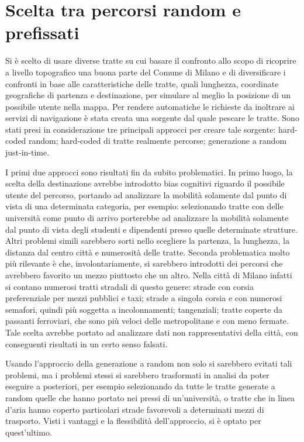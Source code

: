 \section{Scelta tra percorsi random e prefissati}

Si è scelto di usare diverse tratte su cui basare il confronto allo scopo di ricoprire a livello topografico una buona parte del Comune di Milano e di diversificare i confronti in base alle caratteristiche delle tratte, quali lunghezza, coordinate geografiche di partenza e destinazione, per simulare al meglio la posizione di un possibile utente nella mappa. Per rendere automatiche le richieste da inoltrare ai servizi di navigazione è stata creata una sorgente dal quale pescare le tratte. Sono stati presi in considerazione tre principali approcci per creare tale sorgente: hard-coded random; hard-coded di tratte realmente percorse; generazione a random just-in-time.

I primi due approcci sono risultati fin da subito problematici. In primo luogo, la scelta della destinazione avrebbe introdotto bias cognitivi riguardo il possibile utente del percorso, portando ad analizzare la mobilità solamente dal punto di vista di una determinata categoria, per esempio: selezionando tratte con delle università come punto di arrivo porterebbe ad analizzare la mobilità solamente dal punto di vista degli studenti e dipendenti presso quelle determinate strutture. Altri problemi simili sarebbero sorti nello scegliere la partenza, la lunghezza, la distanza dal centro città e numerosità delle tratte. Seconda problematica molto più rilevante è che, involontariamente, si sarebbero introdotti dei percorsi che avrebbero favorito un mezzo piuttosto che un altro. Nella città di Milano infatti si contano numerosi tratti stradali di questo genere: strade con corsia preferenziale per mezzi pubblici e taxi; strade a singola corsia e con numerosi semafori, quindi più soggetta a incolonnamenti; tangenziali; tratte coperte da passanti ferroviari, che sono più veloci delle metropolitane e con meno fermate. Tale scelta avrebbe portato ad analizzare dati non rappresentativi della città, con conseguenti risultati in un certo senso falsati.

Usando l'approccio della generazione a random non solo si sarebbero evitati tali problemi, ma i problemi stessi si sarebbero trasformati in analisi da poter eseguire a posteriori, per esempio selezionando da tutte le tratte generate a random quelle che hanno portato nei pressi di un'università, o tratte che in linea d'aria hanno coperto particolari strade favorevoli a determinati mezzi di trasporto. Visti i vantaggi e la flessibilità dell'approccio, si è optato per quest'ultimo.

